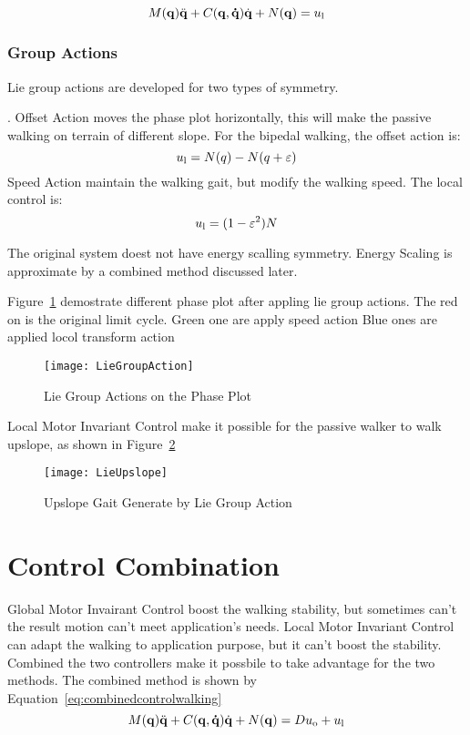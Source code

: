 \begin{equation}
\label{eq:localcontrolwalking}
M(\mathbf{q}) \ddot{\mathbf{q}} + C(\mathbf{q,\dot{q}})\dot{\mathbf{q}} + N(\mathbf{q}) = u_{\mathrm{l}}
\end{equation}

\subsubsection{Group Actions}
Lie group actions are developed for two types of symmetry.
\begin{itemize}

.
Offset Action moves the phase plot horizontally, this will make the passive walking on terrain of different slope.
For the bipedal walking, the offset action is:
\[
u_{\mathrm{l}}=N(q)-N(q+\varepsilon)
\]
Speed Action maintain the walking gait, but modify the walking speed.
The local control is:
\[  
u_{\mathrm{l}}=(1-\varepsilon^2)N
\]
\end{itemize}

The original system doest not have energy scalling symmetry.
Energy Scaling is approximate by a combined method discussed later.

Figure~\ref{fig:walkliegroupphase} demostrate different phase plot after appling lie group actions.
The red on is the original limit cycle.
Green one are apply speed action
Blue ones are applied  locol transform action


\begin{figure}[!htbp]
  \begin{center}
     \texttt{[image: LieGroupAction]}
    \caption{Lie Group Actions on the Phase Plot}
    \label{fig:walkliegroupphase}
\end{center}
\end{figure}


Local Motor Invariant Control make it possible for the passive walker to walk upslope, as shown in Figure~\ref{fig:liegroupupslope}


\begin{figure}[!htbp]
  \begin{center}
      \texttt{[image: LieUpslope]}
    \caption{Upslope Gait Generate by Lie Group Action}
    \label{fig:liegroupupslope}
\end{center}
\end{figure}

\section{Control Combination}
Global Motor Invairant Control boost the walking stability, but sometimes can't the result motion can't meet application's needs.
Local Motor Invariant Control can adapt the walking to application purpose, but it can't boost the stability.
Combined the two controllers make it possbile to take advantage for the two methods.
The combined method is shown by Equation~\ref{eq:combinedcontrolwalking}
\begin{equation}
\label{eq:combinedcontrolwalking}
M(\mathbf{q}) \ddot{\mathbf{q}} + C(\mathbf{q,\dot{q}})\dot{\mathbf{q}} + N(\mathbf{q}) = Du_{\mathrm{o}}+u_{\mathrm{l}}
\end{equation}



